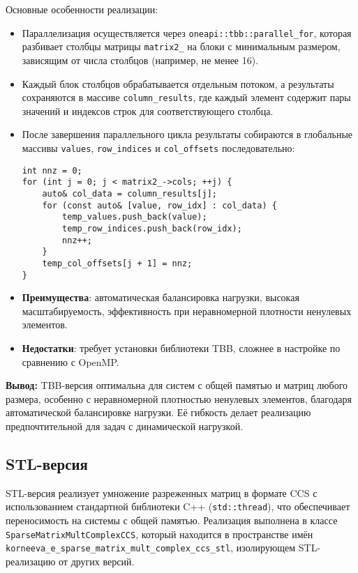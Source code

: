 \documentclass[12pt]{extarticle}
\begin{document}
Основные особенности реализации:
\begin{itemize}
    \item Параллелизация осуществляется через \texttt{oneapi::tbb::parallel\_for}, которая разбивает столбцы матрицы \texttt{matrix2\_} на блоки с минимальным размером, зависящим от числа столбцов (например, не менее 16).
    \item Каждый блок столбцов обрабатывается отдельным потоком, а результаты сохраняются в массиве \texttt{column\_results}, где каждый элемент содержит пары значений и индексов строк для соответствующего столбца.
    \item После завершения параллельного цикла результаты собираются в глобальные массивы \texttt{values}, \texttt{row\_indices} и \texttt{col\_offsets} последовательно:
    \begin{lstlisting}[caption={Объединение результатов в методе RunImpl},label={lst:tbb_merge}]
int nnz = 0;
for (int j = 0; j < matrix2_->cols; ++j) {
    auto& col_data = column_results[j];
    for (const auto& [value, row_idx] : col_data) {
        temp_values.push_back(value);
        temp_row_indices.push_back(row_idx);
        nnz++;
    }
    temp_col_offsets[j + 1] = nnz;
}
    \end{lstlisting}
    \item \textbf{Преимущества}: автоматическая балансировка нагрузки, высокая масштабируемость, эффективность при неравномерной плотности ненулевых элементов.
    \item \textbf{Недостатки}: требует установки библиотеки TBB, сложнее в настройке по сравнению с OpenMP.
\end{itemize}

\textbf{Вывод:} TBB-версия оптимальна для систем с общей памятью и матриц любого размера, особенно с неравномерной плотностью ненулевых элементов, благодаря автоматической балансировке нагрузки. Её гибкость делает реализацию предпочтительной для задач с динамической нагрузкой.

\subsection{STL-версия}

\hspace*{1.25cm}STL-версия реализует умножение разреженных матриц в формате CCS с использованием стандартной библиотеки C++ (\texttt{std::thread}), что обеспечивает переносимость на системы с общей памятью. Реализация выполнена в классе \texttt{SparseMatrixMultComplexCCS}, который находится в пространстве имён \texttt{korneeva\_e\_sparse\_matrix\_mult\_complex\_ccs\_stl}, изолирующем STL-реализацию от других версий.
\end{document}
